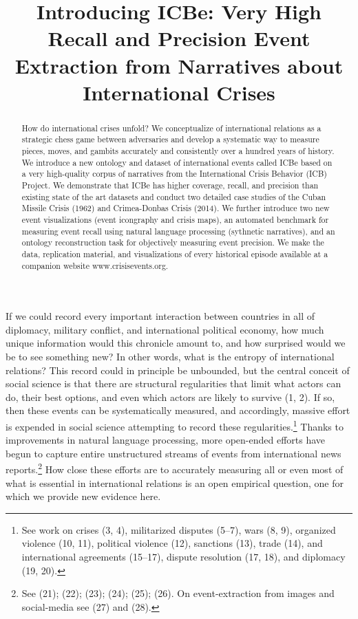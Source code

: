\documentclass{article}
\title{Introducing ICBe: Very High Recall and Precision Event Extraction
from Narratives about International Crises}
\author{
  }
\begin{document}
\maketitle


\begin{abstract}
How do international crises unfold? We conceptualize of international
relations as a strategic chess game between adversaries and develop a
systematic way to measure pieces, moves, and gambits accurately and
consistently over a hundred years of history. We introduce a new
ontology and dataset of international events called ICBe based on a very
high-quality corpus of narratives from the International Crisis Behavior
(ICB) Project. We demonstrate that ICBe has higher coverage, recall, and
precision than existing state of the art datasets and conduct two
detailed case studies of the Cuban Missile Crisis (1962) and
Crimea-Donbas Crisis (2014). We further introduce two new event
visualizations (event icongraphy and crisis maps), an automated
benchmark for measuring event recall using natural language processing
(sythnetic narratives), and an ontology reconstruction task for
objectively measuring event precision. We make the data, replication
material, and visualizations of every historical episode available at a
companion website www.crisisevents.org.
\end{abstract}


\twocolumn

If we could record every important interaction between countries in all
of diplomacy, military conflict, and international political economy,
how much unique information would this chronicle amount to, and how
surprised would we be to see something new? In other words, what is the
entropy of international relations? This record could in principle be
unbounded, but the central conceit of social science is that there are
structural regularities that limit what actors can do, their best
options, and even which actors are likely to survive (1, 2). If so, then
these events can be systematically measured, and accordingly, massive
effort is expended in social science attempting to record these
regularities.\footnote{See work on crises (3, 4), militarized disputes
  (5--7), wars (8, 9), organized violence (10, 11), political violence
  (12), sanctions (13), trade (14), and international agreements
  (15--17), dispute resolution (17, 18), and diplomacy (19, 20).} Thanks
to improvements in natural language processing, more open-ended efforts
have begun to capture entire unstructured streams of events from
international news reports.\footnote{See (21); (22); (23); (24); (25);
  (26). On event-extraction from images and social-media see (27) and
  (28).} How close these efforts are to accurately measuring all or even
most of what is essential in international relations is an open
empirical question, one for which we provide new evidence here.
\end{document}
